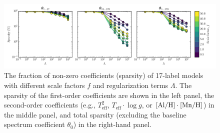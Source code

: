 \documentclass[12pt,preprint]{aastex}
\newcommand{\logg}{\log g}
\newcommand{\Teff}{T_{\mathrm{eff}}}
\begin{document}
\begin{figure}[p]
\includegraphics[width=\textwidth]{sparsity.pdf}
\caption{The fraction of non-zero coefficients (sparsity) of 17-label models with different scale factors $f$ and regularization terms $\Lambda$.  The sparsity of the first-order coefficients are shown in the left panel, the second-order coefficients (e.g., $\Teff^2$, $\Teff\cdot\logg$, or $[\rm{Al}/\rm{H}]\cdot[\rm{Mn}/\rm{H}]$) in the middle panel, and total sparsity (excluding the baseline spectrum coefficient $\theta_0$) in the right-hand panel.\label{fig:sparsity}}
\end{figure}
\end{document}
